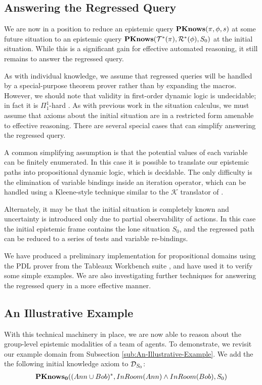 \subsection{Answering the Regressed Query}

We are now in a position to reduce an epistemic query $\mathbf{PKnows}(\pi,\phi,s)$
at some future situation to an epistemic query $\mathbf{PKnows}(\mathcal{T}^{*}(\pi),\mathcal{R}^{*}(\phi),S_{0})$
at the initial situation. While this is a significant gain for effective
automated reasoning, it still remains to answer the regressed query.

As with individual knowledge, we assume that regressed queries will
be handled by a special-purpose theorem prover rather than by expanding
the macros. However, we should note that validity in first-order dynamic
logic is undecidable; in fact it is $\Pi_{1}^{1}$-hard \citep{kooi07dyn_termmodal_logic}.
As with previous work in the situation calculus, we must assume that
axioms about the initial situation are in a restricted form amenable
to effective reasoning. There are several special cases that can simplify
answering the regressed query.

A common simplifying assumption is that the potential values of each
variable can be finitely enumerated. In this case it is possible to
translate our epistemic paths into propositional dynamic logic, which
is decidable. The only difficulty is the elimination of variable bindings
inside an iteration operator, which can be handled using a Kleene-style
technique similar to the $\mathcal{K}$ translator of \citet{vanBenthem06lcc}. 

Alternately, it may be that the initial situation is completely known
and uncertainty is introduced only due to partial observability of
actions. In this case the initial epistemic frame contains the lone
situation $S_{0}$, and the regressed path can be reduced to a series
of tests and variable re-bindings.

We have produced a preliminary implementation for propositional domains
using the PDL prover from the Tableaux Workbench suite \citep{abate07twb_pdl},
and have used it to verify some simple examples. We are also investigating
further techniques for answering the regressed query in a more effective
manner.


\subsection{An Illustrative Example}

With this technical machinery in place, we are now able to reason
about the group-level epistemic modalities of a team of agents. To
demonstrate, we revisit our example domain from Subsection \ref{sub:An-Illustrative-Example}.
We add the the following initial knowledge axiom to $\mathcal{D}_{S_{0}}$:\begin{gather*}
\mathbf{PKnows_{0}}((Ann\cup Bob)^{*},InRoom(Ann)\wedge InRoom(Bob),S_{0})\end{gather*}


